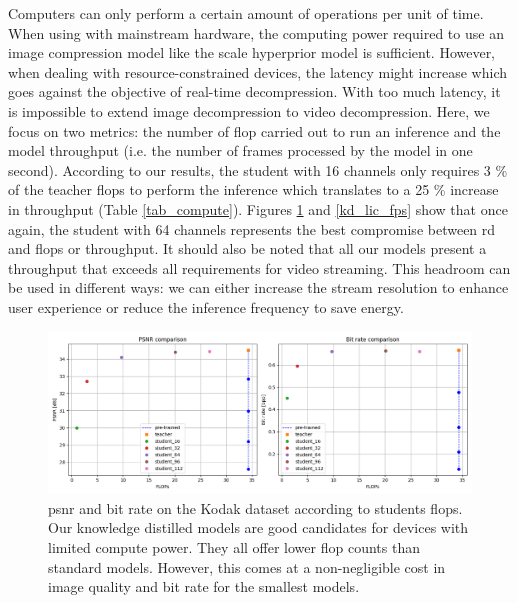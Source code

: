 \documentclass{article}
\begin{document}
Computers can only perform a certain amount of operations per unit of time. When using with mainstream hardware, the computing power required to use an image compression model like the scale hyperprior model is sufficient. However, when dealing with resource-constrained devices, the latency might increase which goes against the objective of real-time decompression. With too much latency, it is impossible to extend image decompression to video decompression. Here, we focus on two metrics: the number of \acrfull{flop} carried out to run an inference and the model throughput (i.e. the number of frames processed by the model in one second). According to our results, the student with 16 channels only requires 3 \% of the teacher \acrshort{flop}s to perform the inference which translates to a 25 \% increase in throughput (Table \ref{tab_compute}). Figures \ref{kd_lic_flop} and \ref{kd_lic_fps} show that once again, the student with 64 channels represents the best compromise between \acrshort{rd} and \acrshort{flop}s or throughput. It should also be noted that all our models present a throughput that exceeds all requirements for video streaming. This headroom can be used in different ways: we can either increase the stream resolution to enhance user experience or reduce the inference frequency to save energy. 

\begin{figure}
    \centering
    \includegraphics[width=15cm]{kd_lic_flop.png}
    \caption[\acrshort{psnr} and bit rate on the Kodak dataset according to students \acrshort{flop}s.]{\acrshort{psnr} and bit rate on the Kodak dataset according to students \acrshort{flop}s. Our knowledge distilled models are good candidates for devices with limited compute power. They all offer lower \acrshort{flop} counts than standard models. However, this comes at a non-negligible cost in image quality and bit rate for the smallest models.}
    \label{kd_lic_flop}
\end{figure}
\end{document}
